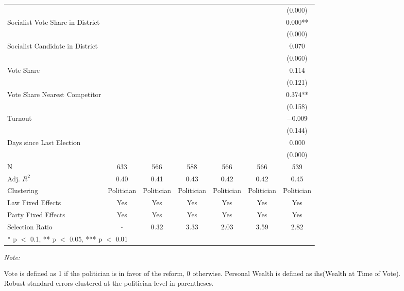 \begin{table}[!h]
{\begin{threeparttable}
\begin{tabular}[t]{lcccccc}
 &  &  &  &  &  & \vphantom{2} (\num{0.000})\\
Socialist Vote Share in District &  &  &  &  &  & \num{0.000}**\\
 &  &  &  &  &  & \vphantom{1} (\num{0.000})\\
Socialist Candidate in District &  &  &  &  &  & \num{0.070}\\
 &  &  &  &  &  & (\num{0.060})\\
Vote Share &  &  &  &  &  & \num{0.114}\\
 &  &  &  &  &  & (\num{0.121})\\
Vote Share Nearest Competitor &  &  &  &  &  & \num{0.374}**\\
 &  &  &  &  &  & (\num{0.158})\\
Turnout &  &  &  &  &  & \num{-0.009}\\
 &  &  &  &  &  & (\num{0.144})\\
Days since Last Election &  &  &  &  &  & \num{0.000}\\
 &  &  &  &  &  & (\num{0.000})\\
\midrule
N & \num{633} & \num{566} & \num{588} & \num{566} & \num{566} & \num{539}\\
Adj. $R^2$ & \num{0.40} & \num{0.41} & \num{0.43} & \num{0.42} & \num{0.42} & \num{0.45}\\
Clustering & Politician & Politician & Politician & Politician & Politician & Politician\\
Law Fixed Effects & Yes & Yes & Yes & Yes & Yes & Yes\\
Party Fixed Effects & Yes & Yes & Yes & Yes & Yes & Yes\\
Selection Ratio & - & 0.32 & 3.33 & 2.03 & 3.59 & 2.82\\
\bottomrule
\multicolumn{7}{l}{\rule{0pt}{1em}* p $<$ 0.1, ** p $<$ 0.05, *** p $<$ 0.01}\\
\end{tabular}
\begin{tablenotes}[para]
\item \textit{Note: } 
\item Vote is defined as 1 if the politician is in favor of the reform, 0 otherwise. Personal Wealth is defined as ihs(Wealth at Time of Vote). Robust standard errors clustered at the politician-level in parentheses.
\end{tablenotes}
\end{threeparttable}}
\end{table}
